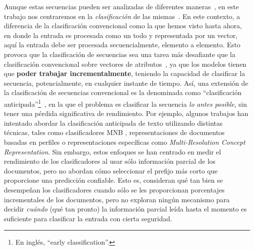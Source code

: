 Aunque estas secuencias pueden ser analizadas de diferentes maneras~\citep{gravessupervised}, en este trabajo nos centraremos en la \emph{clasificación} de las mismas~\citep{xing2010brief}. %
En este contexto, a diferencia de la clasificación convencional como la que hemos visto hasta ahora, en donde la entrada es procesada como un todo y representada por un vector, aquí la entrada debe ser procesada secuencialmente, elemento a elemento.
Esto provoca que la clasificación de secuencias sea una tarea más desafiante que la clasificación convencional sobre vectores de atributos~\citep{xing2010brief}, ya que los modelos tienen que \textbf{poder trabajar incrementalmente}, teniendo la capacidad de clasificar la secuencia, potencialmente, en cualquier instante de tiempo.
Así, una extensión de la clasificación de secuencias convencional es la denominada como ``clasificación anticipada''\footnote{En inglés, ``early classification''.}~\citep{xing2010brief}, en la que el problema es clasificar la secuencia \emph{lo antes posible}, sin tener una pérdida significativa de rendimiento.
Por ejemplo, algunos trabajos han intentado abordar la clasificación anticipada de texto utilizando distintas técnicas, tales como clasificadores \ac{MNB} \cite{escalante2015early}, representaciones de documentos basadas en perfiles\cite{escalante2017early} o representaciones específicas como \emph{Multi-Resolution Concept Representation}\cite{lopez2018early}.
Sin embargo, estos enfoques se han centrado en medir el rendimiento de los clasificadores al usar sólo información parcial de los documentos, pero no abordan cómo seleccionar el prefijo más corto que proporcione una predicción confiable. Esto es, consideran qué tan bien se desempeñan los clasificadores cuando sólo se les proporcionan porcentajes incrementales de los documentos, pero no exploran ningún mecanismo para decidir \emph{cuándo} (qué tan pronto) la información parcial leída hasta el momento es suficiente para clasificar la entrada con cierta seguridad.
